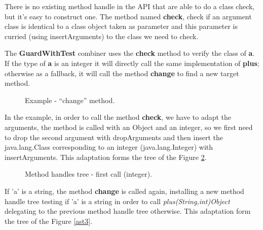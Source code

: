 \documentclass{sig-alternate}
\begin{document}
      There is no existing method handle in the API that are able to do a class check,
      but it's easy to construct one. The method named {\bf check}, check if an argument class
      is identical to a class object taken as parameter and this parameter is curried
      (using insertArguments) to the class we need to check.

      The {\bf GuardWithTest} combiner uses the {\bf check} method to verify the class of {\bf a}.
      If the type of {\bf a} is an integer it will directly call the same implementation of {\bf plus};
      otherwise as a fallback, it will call the method {\bf change} to find a new target method.

      \begin{figure}[!h]
        \centering \vspace{-1.5em}
        \caption{Example - ``change'' method.}
        \label{fooCHANGE}
      \end{figure}

      In the example, in order to call the method {\bf check}, we have to adapt the arguments,
      the method is called with an Object and an integer, so we first need to drop the second
      argument with dropArguments and then insert the java.lang.Class corresponding to an integer
      (java.lang.Integer) with insertArguments.
      This adaptation forms the tree of the Figure \ref{ast2}.

      \begin{figure}[!h]
        \hspace{-.6in} \resizebox{1.3\linewidth}{!}{}
        \caption{Method handles tree - first call (integer).}\vspace{-1em}
        \label{ast2}
      \end{figure}

      If 'a' is a string, the method {\bf change} is called again,
      installing a new method handle tree testing if 'a' is a string in order to call {\it plus(String,int)Object}
      delegating to the previous method handle tree otherwise.
      This adaptation form the tree of the Figure \ref{ast3}.

      \begin{figure*}
        \centering \resizebox{.8\linewidth}{!}{}
        \caption{Method handles tree - second call (string).}\vspace{-1em}
        \label{ast3}
      \end{figure*}
\end{document}

